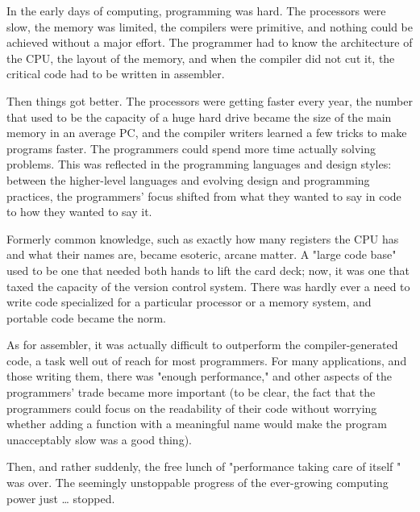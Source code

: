 In the early days of computing, programming was hard. The processors were slow, the memory was limited, the compilers were primitive, and nothing could be achieved without a major effort. The programmer had to know the architecture of the CPU, the layout of the memory, and when the compiler did not cut it, the critical code had to be written in assembler.

Then things got better. The processors were getting faster every year, the number that used to be the capacity of a huge hard drive became the size of the main memory in an average PC, and the compiler writers learned a few tricks to make programs faster. The programmers could spend more time actually solving problems. This was reflected in the programming languages and design styles: between the higher-level languages and evolving design and programming practices, the programmers' focus shifted from what they wanted to say in code to how they wanted to say it.

Formerly common knowledge, such as exactly how many registers the CPU has and what their names are, became esoteric, arcane matter. A "large code base" used to be one that needed both hands to lift the card deck; now, it was one that taxed the capacity of the version control system. There was hardly ever a need to write code specialized for a particular processor or a memory system, and portable code became the norm.

As for assembler, it was actually difficult to outperform the compiler-generated code, a task well out of reach for most programmers. For many applications, and those writing them, there was "enough performance," and other aspects of the programmers' trade became more important (to be clear, the fact that the programmers could focus on the readability of their code without worrying whether adding a function with a meaningful name would make the program unacceptably slow was a good thing).

Then, and rather suddenly, the free lunch of "performance taking care of itself " was over. The seemingly unstoppable progress of the ever-growing computing power just … stopped.


